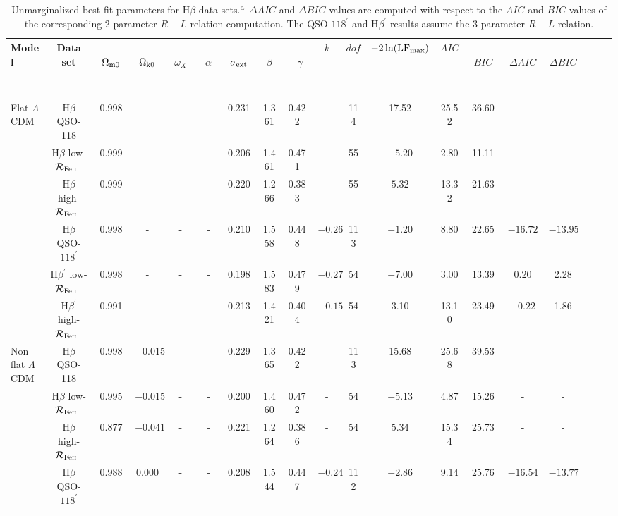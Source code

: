 \documentclass[a4paper,fleqn,usenatbib]{mnras}
\newcommand{\rfe}{${\cal R}_{\rm{Fe\textsc{ii}}}$}
\begin{document}
\begin{table*}
	\centering
	\small\addtolength{\tabcolsep}{-5pt}
	\small
	\caption{Unmarginalized best-fit parameters for H$\beta$ data sets.$^{\rm a}$ $\Delta AIC$ and $\Delta BIC$ values are computed with respect to the $AIC$ and $BIC$ values of the corresponding 2-parameter $R-L$ relation computation. The QSO-$118^{\prime}$ and H$\beta^\prime$ results assume the 3-parameter $R-L$ relation.}
	\label{tab:BFP}
	\begin{threeparttable}
	\begin{tabular}{l|cccccccccccccccccc} %
		\hline
		Model & Data set & \ \ $\Omega_{\rm m0}$ \ \ & \ \ $\Omega_{\rm k0}$ \ \ & \ \ $\omega_{X}$ \ \ & \ \ $\alpha$ \ \ & \ \ $\sigma_{\rm ext}$ \ \ & \ \ $\beta$ \ \ & \ \ \ \ $\gamma$ \ \ \ \ & $k$  &  $dof$ & $-2\ln({\rm LF}_{\rm max})$ & $AIC$ & \ \ $BIC$ \ \ & \ $\Delta AIC$ \ & \ $\Delta BIC$\\
		\hline
	    Flat $\Lambda$CDM & H$\beta$ QSO-118 & 0.998  & - & - &- & 0.231 & 1.361 & 0.422 & - & 114 & 17.52 & 25.52 & 36.60  & - & - \\
	    & H$\beta$ low-\rfe\ & 0.999 & - & - & - & 0.206 & 1.461 & 0.471 & - & 55 & $-5.20$ & 2.80 & 11.11  & - & - \\
	    & H$\beta$ high-\rfe\ & 0.999 & - & - & - & 0.220 & 1.266 & 0.383 & - & 55 & $5.32$ & 13.32 & 21.63  & - & - \\
		& H$\beta$ QSO-$118^{\prime}$ & 0.998 & - & - & - & 0.210 & 1.558 & 0.448 & $-0.264$ & 113 & $-1.20$ & 8.80 & 22.65  & $-16.72$ & $-13.95$\\
		& H$\beta^{\prime}$ low-\rfe\ & 0.998 & - & - & - & 0.198 & 1.583 & 0.479 & $-0.272$ & 54 & $-7.00$ & 3.00 & 13.39 & $0.20$ & 2.28 \\
		& H$\beta^{\prime}$ high-\rfe\ & 0.991 & - & - & - & 0.213 & 1.421 & 0.404 & $-0.150$ & 54 & 3.10 & 13.10 & 23.49 & $-0.22$ & 1.86 \\
		\hline
		Non-flat $\Lambda$CDM & H$\beta$ QSO-118 & 0.998 & $-0.015$ & - & - & 0.229 & 1.365 & 0.422 & - & 113 & 15.68 & 25.68 & 39.53  & - & - \\
		& H$\beta$ low-\rfe\ & 0.995 & $-0.015$ & - & - & 0.200 & 1.460 & 0.472 & - & 54 & $-5.13$ & 4.87 & 15.26 & - & -  \\
		& H$\beta$ high-\rfe\ & 0.877 & $-0.041$ & - & - & 0.221 & 1.264 & 0.386 & - & 54 & $5.34$ & 15.34 & 25.73 & - & -  \\
		& H$\beta$ QSO-$118^{\prime}$ & 0.988 & 0.000& - & - & 0.208 & 1.544 & 0.447 & $-0.247$ & 112 & $-2.86$ & 9.14 & 25.76 & $-16.54$ & $-13.77$ \\

\end{tabular}
\end{threeparttable}
\end{table*}
\end{document}
